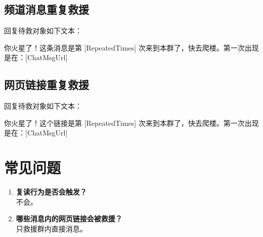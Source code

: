 \documentclass[a4paper,12pt]{article}
\begin{document}
    \subsection{频道消息重复救援}

    回复待救对象如下文本：

    \begin{framed}
        {\ttfamily 你火星了！这条消息是第 [RepeatedTimes] 次来到本群了，快去爬楼。第一次出现是在：[ChatMsgUrl]}
    \end{framed}

    \subsection{网页链接重复救援}

    回复待救对象如下文本：

    \begin{framed}
        {\ttfamily 你火星了！这个链接是第 [RepeatedTimes] 次来到本群了，快去爬楼。第一次出现是在：[ChatMsgUrl]}
    \end{framed}

    \section{常见问题}

    \begin{enumerate}
        \item \textbf{复读行为是否会触发？}\\不会。
        \item \textbf{哪些消息内的网页链接会被救援？}\\只救援群内直接消息。
    \end{enumerate}
\end{document}
